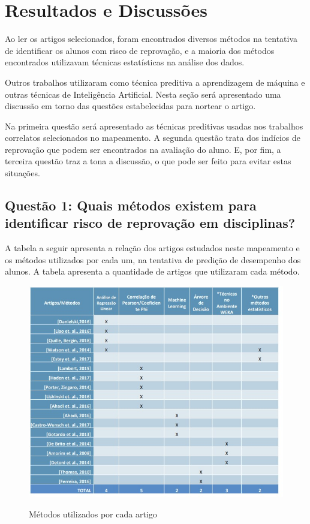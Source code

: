 \documentclass[12pt]{article}
\begin{document}
\section{Resultados e Discussões}

Ao ler os artigos selecionados, foram encontrados diversos métodos na tentativa de identificar os alunos com risco de reprovação, e a maioria dos métodos encontrados utilizavam técnicas estatísticas na análise dos dados.

Outros trabalhos utilizaram como técnica preditiva a aprendizagem de máquina e outras técnicas de Inteligência Artificial. Nesta seção será apresentado uma discussão em torno das questões estabelecidas para nortear o artigo.

Na primeira questão será apresentado as técnicas preditivas usadas nos trabalhos correlatos selecionados no mapeamento. A segunda questão trata dos indícios de reprovação que podem ser encontrados na avaliação do aluno. E, por fim, a terceira questão traz a tona a discussão, o que pode ser feito para evitar estas situações.

\subsection{\textbf{Questão 1: Quais métodos existem para identificar risco de reprovação em disciplinas?}}


 A tabela a seguir apresenta a relação dos artigos estudados neste mapeamento e os métodos utilizados por cada um, na tentativa de predição de desempenho dos alunos. A tabela apresenta a quantidade de artigos que utilizaram cada método.

\begin{figure}[ht]
\centering
\caption{Métodos utilizados por cada artigo}
\label{tab:exTable1}
\includegraphics[width=1\textwidth]{Taable.jpg}
\label{fig:table}
\end{figure}
\end{document}
